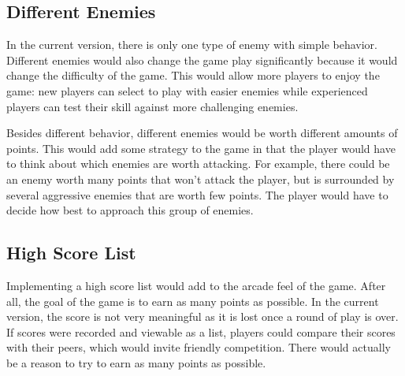 \documentclass{article}
\begin{document}
\subsection{Different Enemies}
In the current version, there is only one type of enemy with simple behavior. Different enemies would also change the game play significantly because it would change the difficulty of the game. This would allow more players to enjoy the game: new players can select to play with easier enemies while experienced players can test their skill against more challenging enemies.

Besides different behavior, different enemies would be worth different amounts of points. This would add some strategy to the game in that the player would have to think about which enemies are worth attacking. For example, there could be an enemy worth many points that won't attack the player, but is surrounded by several aggressive enemies that are worth few points. The player would have to decide how best to approach this group of enemies.

\subsection{High Score List}
Implementing a high score list would add to the arcade feel of the game. After all, the goal of the game is to earn as many points as possible. In the current version, the score is not very meaningful as it is lost once a round of play is over. If scores were recorded and viewable as a list, players could compare their scores with their peers, which would invite friendly competition. There would actually be a reason to try to earn as many points as possible.


\newpage


\end{document}
